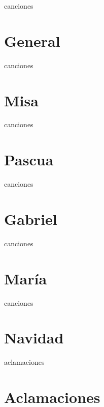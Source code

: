 

\begin{songs}{canciones}
    \part{General}
    
    
    \setcounter{lastValue}{\thesongnum}
\end{songs}
\begin{songs}{canciones}
    \setcounter{songnum}{\thelastValue}
    \part{Misa}
    
    
    \setcounter{lastValue}{\thesongnum}
\end{songs}
\begin{songs}{canciones}
    \setcounter{songnum}{\thelastValue}
    \part{Pascua}
    
    
    \setcounter{lastValue}{\thesongnum}
\end{songs}
\begin{songs}{canciones}
    \setcounter{songnum}{\thelastValue}
    \part{Gabriel}
    
    
    \setcounter{lastValue}{\thesongnum}
\end{songs}
\begin{songs}{canciones}
    \setcounter{songnum}{\thelastValue}
    \part{María}
    
    
    \setcounter{lastValue}{\thesongnum}
\end{songs}
\begin{songs}{canciones}
    \setcounter{songnum}{\thelastValue}
    \part{Navidad}
    
    
    \setcounter{lastValue}{\thesongnum}
\end{songs}
\begin{songs}{aclamaciones}
    \part{Aclamaciones}
    \renewcommand{\thesongnum}{A\arabic{songnum}}
    
    
\end{songs}